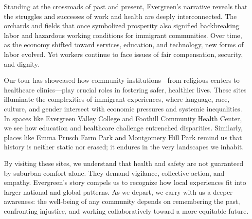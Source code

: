 \documentclass[12pt]{article}
\begin{document}
Standing at the crossroads of past and present, Evergreen’s narrative reveals that the struggles and successes of work and health are deeply interconnected. The orchards and fields that once symbolized prosperity also signified backbreaking labor and hazardous working conditions for immigrant communities. Over time, as the economy shifted toward services, education, and technology, new forms of labor evolved. Yet workers continue to face issues of fair compensation, security, and dignity.

Our tour has showcased how community institutions—from religious centers to healthcare clinics—play crucial roles in fostering safer, healthier lives. These sites illuminate the complexities of immigrant experiences, where language, race, culture, and gender intersect with economic pressures and systemic inequalities. In spaces like Evergreen Valley College and Foothill Community Health Center, we see how education and healthcare challenge entrenched disparities. Similarly, places like Emma Prusch Farm Park and Montgomery Hill Park remind us that history is neither static nor erased; it endures in the very landscapes we inhabit.

By visiting these sites, we understand that health and safety are not guaranteed by suburban comfort alone. They demand vigilance, collective action, and empathy. Evergreen’s story compels us to recognize how local experiences fit into larger national and global patterns. As we depart, we carry with us a deeper awareness: the well-being of any community depends on remembering the past, confronting injustice, and working collaboratively toward a more equitable future.



\end{document}

